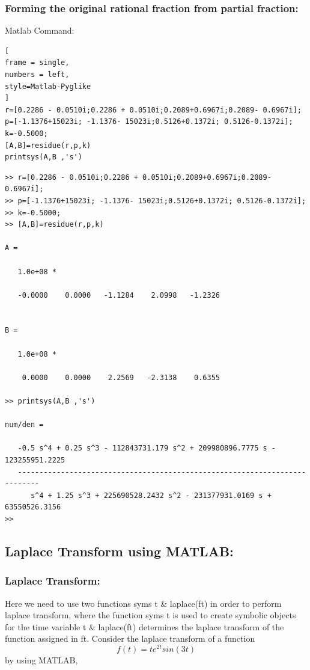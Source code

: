 \documentclass[conference]{IEEEtran}
\begin{document}
\subsubsection{Forming the original rational 
fraction from partial fraction:}

Matlab Command:
\begin{lstlisting}[
frame = single,
numbers = left,
style=Matlab-Pyglike
]
r=[0.2286 - 0.0510i;0.2286 + 0.0510i;0.2089+0.6967i;0.2089- 0.6967i];
p=[-1.1376+15023i; -1.1376- 15023i;0.5126+0.1372i; 0.5126-0.1372i];
k=-0.5000;
[A,B]=residue(r,p,k)
printsys(A,B ,'s')

\end{lstlisting}

\begin{verbatim}
>> r=[0.2286 - 0.0510i;0.2286 + 0.0510i;0.2089+0.6967i;0.2089- 0.6967i];
>> p=[-1.1376+15023i; -1.1376- 15023i;0.5126+0.1372i; 0.5126-0.1372i];
>> k=-0.5000;
>> [A,B]=residue(r,p,k)

A =

   1.0e+08 *

   -0.0000    0.0000   -1.1284    2.0998   -1.2326


B =

   1.0e+08 *

    0.0000    0.0000    2.2569   -2.3138    0.6355

>> printsys(A,B ,'s')
 
num/den = 
 
   -0.5 s^4 + 0.25 s^3 - 112843731.179 s^2 + 209980896.7775 s - 123255951.2225
   ---------------------------------------------------------------------------
      s^4 + 1.25 s^3 + 225690528.2432 s^2 - 231377931.0169 s + 63550526.3156
>> 
\end{verbatim}






\subsection{Laplace Transform using MATLAB:}
\subsubsection{Laplace Transform:}
Here we need to use two functions syms t \& laplace(ft) in order to perform laplace transform, where the 
function syms t is used to create symbolic 
objects for the time variable t \& laplace(ft)
determines the laplace transform of the 
function assigned in ft.
Consider the laplace transform of a function 
$$f(t)=te^{2t}sin(3t) $$ by using MATLAB,
\end{document}
